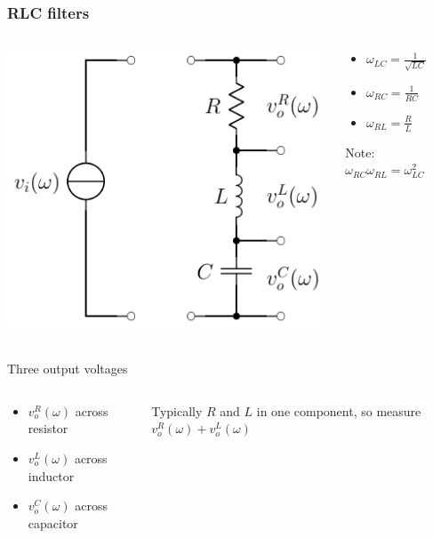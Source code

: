 \documentclass[beamer]{standalone}
\begin{document}
\begin{frame}
 \frametitle{RLC filters}
 \begin{columns}
  \begin{column}{0.4\textwidth}
   \includegraphics[width=\textwidth]{pics/RLC_circuit}
  \end{column}
  \begin{column}{0.6\textwidth}
   \begin{itemize}
    \item $\omega_{LC} = \frac{1}{\sqrt{LC}}$
    \item $\omega_{RC} = \frac{1}{RC}$
    \item $\omega_{RL} = \frac{R}{L}$
   \end{itemize}
   Note: $\omega_{RC} \omega_{RL} = \omega^2_{LC}$
  \end{column}
 \end{columns}
 \begin{block}{Three output voltages}
  \begin{columns}
   \begin{column}{0.5\textwidth}
    \begin{itemize}
     \item $v_o^R(\omega)$ across resistor
     \item $v_o^L(\omega)$ across inductor
     \item $v_o^C(\omega)$ across capacitor
    \end{itemize}
   \end{column}
   \begin{column}{0.5\textwidth}
    Typically $R$ and $L$ in one component, so measure $v_o^R(\omega) + v_o^L(\omega)$
   \end{column}
  \end{columns}
 \end{block}
\end{frame}
\end{document}
